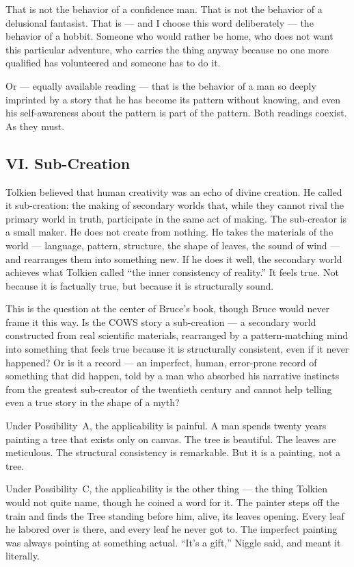 That is not the behavior of a confidence man. That is not the behavior of a delusional fantasist. That is --- and I choose this word deliberately --- the behavior of a hobbit. Someone who would rather be home, who does not want this particular adventure, who carries the thing anyway because no one more qualified has volunteered and someone has to do it.

Or --- equally available reading --- that is the behavior of a man so deeply imprinted by a story that he has become its pattern without knowing, and even his self-awareness about the pattern is part of the pattern. Both readings coexist. As they must.


\subsection*{VI. Sub-Creation}
\label{spine:so-sub-creation}

Tolkien believed that human creativity was an echo of divine creation. He called it sub-creation: the making of secondary worlds that, while they cannot rival the primary world in truth, participate in the same act of making. The sub-creator is a small maker. He does not create from nothing. He takes the materials of the world --- language, pattern, structure, the shape of leaves, the sound of wind --- and rearranges them into something new. If he does it well, the secondary world achieves what Tolkien called ``the inner consistency of reality.'' It feels true. Not because it is factually true, but because it is structurally sound.

This is the question at the center of Bruce's book, though Bruce would never frame it this way. Is the COWS story a sub-creation --- a secondary world constructed from real scientific materials, rearranged by a pattern-matching mind into something that feels true because it is structurally consistent, even if it never happened? Or is it a record --- an imperfect, human, error-prone record of something that did happen, told by a man who absorbed his narrative instincts from the greatest sub-creator of the twentieth century and cannot help telling even a true story in the shape of a myth?

Under Possibility~A, the applicability is painful. A man spends twenty years painting a tree that exists only on canvas. The tree is beautiful. The leaves are meticulous. The structural consistency is remarkable. But it is a painting, not a tree.

Under Possibility~C, the applicability is the other thing --- the thing Tolkien would not quite name, though he coined a word for it. The painter steps off the train and finds the Tree standing before him, alive, its leaves opening. Every leaf he labored over is there, and every leaf he never got to. The imperfect painting was always pointing at something actual. ``It's a gift,'' Niggle said, and meant it literally.

